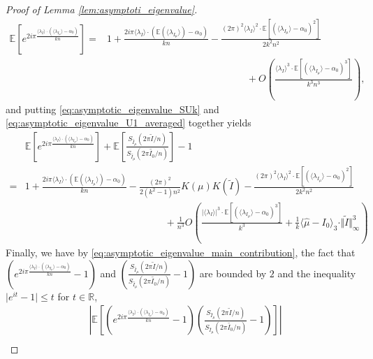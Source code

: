 \documentclass[10pt,11pt]{amsart}%
\begin{document}
\begin{proof}[Proof of Lemma \ref{lem:asymptoti_eigenvalue}]
\begin{align}
\mathbb{E}\left[e^{2i\pi \frac{\langle \lambda_I\rangle\cdot(\langle \lambda_{I_{\mu}}\rangle-\alpha_0)}{kn}}\right]=&1+\frac{2i\pi \langle \lambda_I\rangle\cdot \left(\mathbb{E}(\langle \lambda_{I_{\mu}}\rangle)-\alpha_0\right)}{kn}-\frac{(2\pi)^2\langle \lambda_I\rangle^2\cdot \mathbb{E}\left[\left(\langle \lambda_{I_{\mu}}\rangle-\alpha_0\right)^2\right]}{2k^2n^2}\nonumber\\
&\hspace{6cm}+O\left(\frac{\langle \lambda_I\rangle^3\cdot\mathbb{E}\left[\left(\langle \lambda_{I_{\mu}}\rangle-\alpha_0\right)^3\right]}{k^3n^3}\right),\label{eq:asymptotic_eigenvalue_U1_averaged}
\end{align}
and putting \eqref{eq:asymptotic_eigenvalue_SUk} and \eqref{eq:asymptotic_eigenvalue_U1_averaged} together yields
\begin{align}
&\mathbb{E}\left[e^{2i\pi \frac{\langle \lambda_I\rangle\cdot(\langle \lambda_{I_{\mu}}\rangle-\alpha_0)}{kn}}\right]+\mathbb{E}\left[\frac{S_{\hat{I}_{\mu}}(2\pi \tilde{I}/n)}{S_{\hat{I}_{\mu}}(2\pi\tilde{I_0}/n)}\right]-1\nonumber\\
=&1+\frac{2i\pi \langle \lambda_I\rangle\cdot \left(\mathbb{E}(\langle \lambda_{I_{\mu}}\rangle)-\alpha_0\right)}{kn}-\frac{(2\pi)^2}{2(k^2-1)n^2}K(\mu)K(\widetilde{I})-\frac{(2\pi)^2\langle \lambda_I\rangle^2\cdot \mathbb{E}\left[\left(\langle \lambda_{I_{\mu}}\rangle-\alpha_0\right)^2\right]}{2k^2n^2}\label{eq:final_estimate_first_part}\\
&\hspace{6cm}+\frac{1}{n^3}O\left(\frac{\vert\langle \lambda_I\rangle\vert^3\cdot\mathbb{E}\left[\left(\langle \lambda_{I_{\mu}}\rangle-\alpha_0\right)^3\right]}{k^3}+\frac{1}{k}\langle\hat{\mu}-I_0\rangle_3\cdot\Vert \tilde{I}\Vert_\infty^3\right)\nonumber
\end{align}
Finally, we have by \eqref{eq:asymptotic_eigenvalue_main_contribution}, the fact that 
$\left(e^{2i\pi \frac{\langle \lambda_I\rangle\cdot(\langle \lambda_{I_{\mu}}\rangle-\alpha_0)}{kn}}-1\right)$ and $\left(\frac{S_{\hat{I}_{\mu}}(2\pi \tilde{I}/n)}{S_{\hat{I}_{\mu}}(2\pi\tilde{I_0}/n)}-1\right)$ are bounded by $2$ and the inequality $\vert e^{it}-1\vert\leq t$ for $t\in \mathbb{R}$,
\begin{align*}
&\left\vert\mathbb{E}\left[\left(e^{2i\pi \frac{\langle \lambda_I\rangle\cdot(\langle \lambda_{I_{\mu}}\rangle-\alpha_0)}{kn}}-1\right)\left(\frac{S_{\hat{I}_{\mu}}(2\pi \tilde{I}/n)}{S_{\hat{I}_{\mu}}(2\pi\tilde{I_0}/n)}-1\right)\right]\right\vert\\

\end{align*}
\end{proof}
\end{document}
